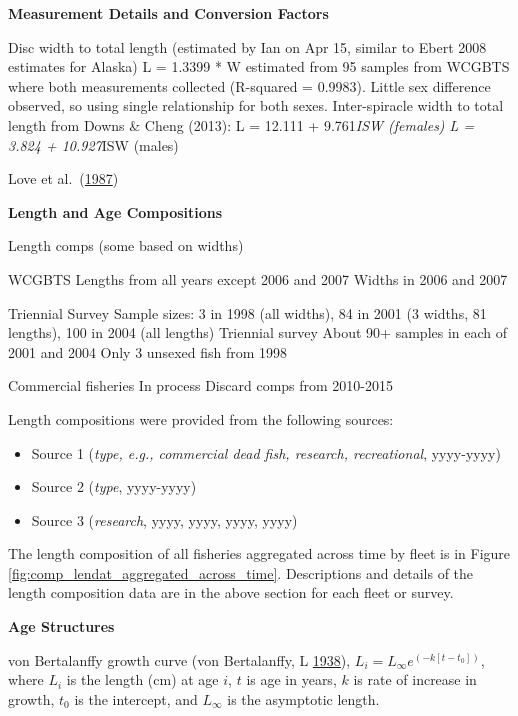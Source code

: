 \documentclass[12pt,]{article}
\begin{document}
\textbf{Measurement Details and Conversion Factors}

Disc width to total length (estimated by Ian on Apr 15, similar to Ebert
2008 estimates for Alaska) L = 1.3399 * W estimated from 95 samples from
WCGBTS where both measurements collected (R-squared = 0.9983). Little
sex difference observed, so using single relationship for both sexes.
Inter-spiracle width to total length from Downs \& Cheng (2013): L =
12.111 + 9.761\emph{ISW (females) L = 3.824 + 10.927}ISW (males)

Love et al.~(\protect\hyperlink{ref-Love1987}{1987})

\textbf{Length and Age Compositions}

Length comps (some based on widths)

WCGBTS Lengths from all years except 2006 and 2007 Widths in 2006 and
2007

Triennial Survey Sample sizes: 3 in 1998 (all widths), 84 in 2001 (3
widths, 81 lengths), 100 in 2004 (all lengths) Triennial survey About
90+ samples in each of 2001 and 2004 Only 3 unsexed fish from 1998

Commercial fisheries In process Discard comps from 2010-2015

Length compositions were provided from the following sources:

\begin{itemize}[noitemsep,nolistsep,topsep=0pt]
  \item Source 1 (\emph{type, e.g., commercial dead fish, research, recreational}, yyyy-yyyy)    
  \item Source 2 (\emph{type}, yyyy-yyyy)    
  \item Source 3 (\emph{research}, yyyy, yyyy, yyyy, yyyy) 
\end{itemize}

The length composition of all fisheries aggregated across time by fleet
is in Figure \ref{fig:comp_lendat_aggregated_across_time}. Descriptions
and details of the length composition data are in the above section for
each fleet or survey.

\vspace{.5cm}

\textbf{Age Structures}

von Bertalanffy growth curve (von Bertalanffy, L
\protect\hyperlink{ref-VonB}{1938}),
\(L_i = L_{\infty}e^{(-k[t-t_0])}\), where \(L_i\) is the length (cm) at
age \(i\), \(t\) is age in years, \(k\) is rate of increase in growth,
\(t_0\) is the intercept, and \(L_{\infty}\) is the asymptotic length.
\end{document}

